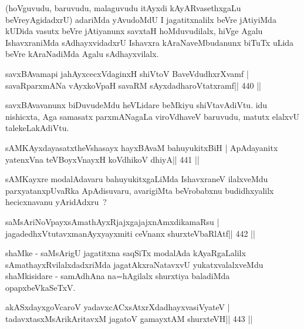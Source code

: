 \begin{artha}
(hoVguvudu, baruvudu, malaguvudu itAyxdi kAyARvasethxgaLu
  beVreyAgidadxrU) adariMda yAvudoMdU I jagatitxnalilx beVre jAtiyiMda
  kUDida vasutx beVre jAtiyanunx savxtaH hoMduvudilalx, hiVge Agalu
  IshavxraniMda sAdhayxvidadxrU Ishavxra kAraNaveMbudanunx biTuTx
  uLida beVre kAraNadiMda Agalu sAdhayxvilalx.
\end{artha}


\begin{shl}
savxBAvamapi ja{hAyx}cecxVdaginxH shiVtoV BaveVdudhxrXvamf |
savaRparxmANa vAyxkoVpaH savaRM sAyxdadharoVtatxramf\hfill || 440 ||
\end{shl}

\begin{artha}
savxBAvavanunx biDuvudeMdu heVLidare beMkiyu shiVtavAdiVtu. idu nishicxta, Aga samasatx parxmANagaLa viroVdhaveV baruvudu, matutx elalxvU talekeLakAdiVtu.
\end{artha}


\begin{shl}
sAMKAyxdayasatxtheVshasayx hayxBAvaM bahuyukitxBiH |
ApAdayanitx yatenxVna teVBoyxV\s nayxH koV\s dhikoV dhiyA\hfill || 441 ||
\end{shl}

\begin{artha}
sAMKayxre modalAdavaru bahuyukitxgaLiMda IshavxraneV ilalxveMdu
parxyatanxpUvaRka ApAdisuvaru, avarigiMta beVrobabxnu budidhxyalilx
hecicxnavanu yAridAdxru~?
\end{artha}


\begin{shl}
saMsAriNoV\s payxsAmathAyxRjajxgajajxnAmxdikamaRsu |
jagadedhxVtutavxmanAyxyayxmiti ceVnanx shurxteVbaRlAtf\hfill || 442 ||
\end{shl}

\begin{artha}
shaMke - saMsArigU jagatitxna saqSiTx modalAda kAyaRgaLalilx
sAmathayxRvilalxdadxriMda jagatAkxraNatavxvU yukatxvalalxveMdu
shaMkisidare - samAdhAna na=hAgilalx shurxtiya baladiMda 
opapxbeVkaSeTxV.
\end{artha}

\begin{shl}
akASxdayxgoVcaroV yadavxcACxsAtxrXdadhayxvasiVyateV |
tadavxtasxMsArikAritavxM jagatoV gamayxtAM shurxteVH\hfill || 443 ||
\end{shl}

